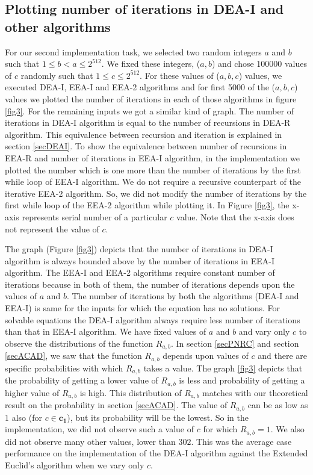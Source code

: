 \documentclass[pdflatex,sn-mathphys-num]{sn-jnl}%
\theoremstyle{thmstyleone}%
\theoremstyle{thmstyletwo}%
\theoremstyle{thmstylethree}%
\begin{document}
 \subsection{Plotting number of iterations in DEA-I and other algorithms} 
For our second implementation task, we selected two random integers $a$ and $b$ such that $1 \le b < a \le 2^{512}$. We fixed these integers, ($a,b$) and chose 100000 values of $c$ randomly such that $1\le c \le 2^{512}$. For these values of  ($a,b,c$) values, we executed DEA-I, EEA-I and EEA-2 algorithms and for first 5000 of the ($a,b,c$) values we plotted the number of iterations in each of those algorithms in figure \ref{fig3}. For the remaining inputs we got a similar kind of graph. The number of iterations in DEA-I algorithm is equal to the number of recursions in DEA-R algorithm. This equivalence between recursion and iteration is explained in section \ref{secDEAI}. To show the equivalence between number of recursions in EEA-R and number of iterations in EEA-I algorithm, in the implementation we plotted the number which is one more than the number of iterations by the first while loop of EEA-I algorithm. We do not require a recursive counterpart of the iterative EEA-2 algorithm. So, we did not modify the number of iterations by the first while loop of the EEA-2 algorithm while plotting it. In Figure \ref{fig3}, the x-axis represents serial number of a particular $c$ value. Note that the x-axis does not represent the value of $c$.
\par
The graph (Figure \ref{fig3}) depicts that the number of iterations in DEA-I algorithm is always bounded above by the number of iterations in EEA-I algorithm. The EEA-I and EEA-2 algorithms require constant number of iterations because in both of them, the number of iterations depends upon  the values of $a$ and $b$. The number of iterations by both the algorithms (DEA-I and EEA-I) is same for the inputs for which the equation has no solutions. For solvable equations the DEA-I algorithm always require less number of iterations than that in EEA-I algorithm. We have fixed values of $a$ and $b$ and vary only $c$ to observe the distributions of the function $R_{a,b}$. In section \ref{secPNRC} and section \ref{secACAD}, we saw that the function $R_{a,b}$ depends upon values of $c$ and there are specific probabilities with which $R_{a,b}$ takes a value. The graph \ref{fig3} depicts that the probability of getting a lower value of $R_{a,b}$ is less and probability of getting a higher value of $R_{a,b}$ is high. This distribution of $R_{a,b}$ matches with our theoretical result
on the probability in section \ref{secACAD}. The value of $R_{a,b}$ can be as low as $1$ also (for $c \in \mathbf{c_1}$), but its probability will be the lowest. So in the implementation, we did not observe such a value of $c$ for which $R_{a,b}=1$. We also did not observe many other values,  lower than $302$. This was the average case performance on the implementation of the DEA-I algorithm against the Extended Euclid's algorithm when we vary only $c$. 
\end{document}
